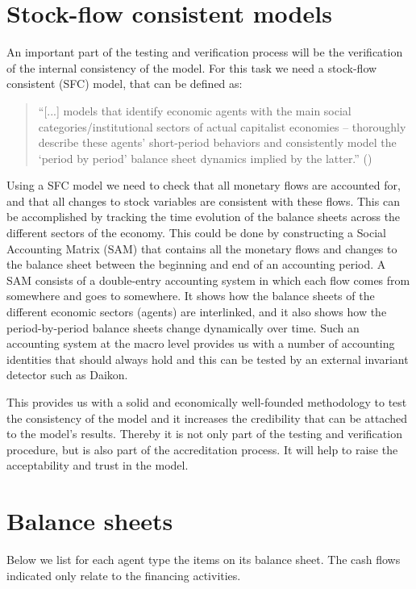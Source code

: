 
\section{Stock-flow consistent models}
An important part of the testing and verification process will be the verification of the internal consistency of the model. For this task we need a stock-flow consistent (SFC) model, that can be defined as:
\begin{quote}
``[...] models that identify economic agents with the main social categories/institutional sectors of actual capitalist economies -- thoroughly describe these agents' short-period behaviors and consistently model the `period by period' balance sheet dynamics implied by the latter.'' (\citet[p. 2]{Macedo-e-Silva:2008})
\end{quote}
Using a SFC model we need to check that all monetary flows are accounted for, and that all changes to stock variables are consistent with these flows. This can be accomplished by tracking the time evolution of the balance sheets across the different sectors of the economy. This could be done by constructing a Social Accounting Matrix (SAM) that contains all the monetary flows and changes to the balance sheet between the beginning and end of an accounting period. A SAM consists of a double-entry accounting system in which each flow comes from somewhere and goes to somewhere. It shows how the balance sheets of the different economic sectors (agents) are interlinked, and it also shows how the period-by-period balance sheets change dynamically over time. Such an accounting system at the macro level provides us with a number of accounting identities that should always hold and this can be tested by an external invariant detector such as Daikon.

This provides us with a solid and economically well-founded methodology to test the consistency of the model and it increases the credibility that can be attached to the model's results. Thereby it is not only part of the testing and verification procedure, but is also part of the accreditation process. It will help to raise the acceptability and trust in the model.

\section{Balance sheets}
Below we list for each agent type the items on its balance sheet. The cash flows indicated only relate to the financing activities.

